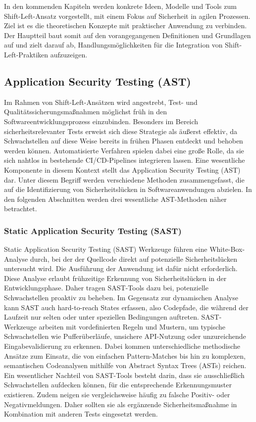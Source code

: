 \documentclass[acmtog]{acmart}
\begin{document}
In den kommenden Kapiteln werden konkrete Ideen, Modelle und Tools zum Shift-Left-Ansatz vorgestellt, mit einem Fokus auf Sicherheit in agilen Prozessen. Ziel ist es die theoretischen Konzepte mit praktischer Anwendung zu verbinden. Der Hauptteil baut somit auf den vorangegangenen Definitionen und Grundlagen auf und zielt darauf ab, Handlungsmöglichkeiten für die Integration von Shift-Left-Praktiken aufzuzeigen.





 
\subsection{Application Security Testing (AST)}
Im Rahmen von Shift-Left-Ansätzen wird angestrebt, Test- und Qualitätssicherungsmaßnahmen möglichst früh in den Softwareentwicklungsprozess einzubinden.
Besonders im Bereich sicherheitsrelevanter Tests erweist sich diese Strategie als äußerst effektiv, da Schwachstellen auf diese Weise bereits in frühen Phasen entdeckt und behoben werden können.
Automatisierte Verfahren spielen dabei eine große Rolle, da sie sich nahtlos in bestehende CI/CD-Pipelines integrieren lassen. \cite{}
Eine wesentliche Komponente in diesem Kontext stellt das Application Security Testing (AST) dar. 
Unter diesem Begriff werden verschiedene Methoden zusammengefasst, die auf die Identifizierung von Sicherheitslücken in Softwareanwendungen abzielen. \cite{mateo_tudela_combining_2020}
In den folgenden Abschnitten werden drei wesentliche AST-Methoden näher betrachtet.

\subsubsection{Static Application Security Testing (SAST)}
Static Application Security Testing (SAST) Werkzeuge führen eine White-Box-Analyse durch, bei der der Quellcode direkt auf potenzielle Sicherheitslücken untersucht wird.
Die Ausführung der Anwendung ist dafür nicht erforderlich.
Diese Analyse erlaubt frühzeitige Erkennung von Sicherheitslücken in der Entwicklungsphase. 
Daher tragen SAST-Tools dazu bei, potenzielle Schwachstellen proaktiv zu beheben. 
Im Gegensatz zur dynamischen Analyse kann SAST auch hard-to-reach States erfassen, also Codepfade, die während der Laufzeit nur selten oder unter speziellen Bedingungen auftreten.
SAST-Werkzeuge arbeiten mit vordefinierten Regeln und Mustern, um typische Schwachstellen wie Pufferüberläufe, unsichere API-Nutzung oder unzureichende Eingabevalidierung zu erkennen.
Dabei kommen unterschiedliche methodische Ansätze zum Einsatz, die von einfachen Pattern-Matches bis hin zu komplexen, semantischen Codeanalysen mithilfe von Abstract Syntax Trees (ASTs) reichen.
Ein wesentlicher Nachteil von SAST-Tools besteht darin, dass sie ausschließlich Schwachstellen aufdecken können, für die entsprechende Erkennungsmuster existieren.
Zudem neigen sie vergleichsweise häufig zu falsche Positiv- oder Negativmeldungen.
Daher sollten sie als ergänzende Sicherheitsmaßnahme in Kombination mit anderen Tests eingesetzt werden. \cite{chess_static_2004}
\end{document}
